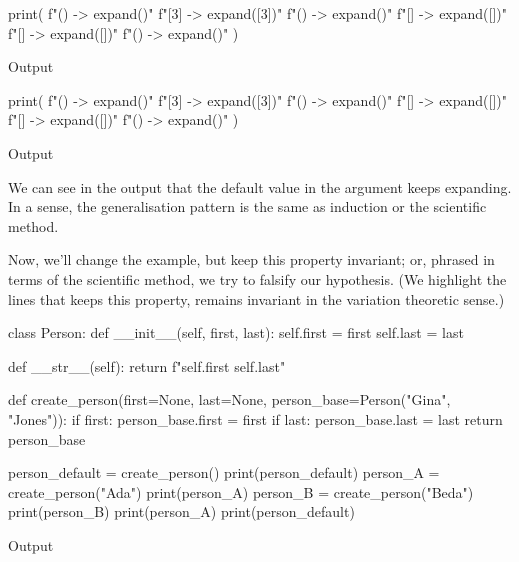 \begin{description}
    \begin{minipage}[t]{0.45\columnwidth}
      \begin{pyblock}[default1]
print(
  f"()  -> {expand()}\n"
  f"[3] -> {expand([3])}\n"
  f"()  -> {expand()}\n"
  f"[]  -> {expand([])}\n"
  f"[]  -> {expand([])}\n"
  f"()  -> {expand()}\n"
)
      \end{pyblock}
      \begin{block}{Output}\printpythontex[verbatim]\end{block}
    \end{minipage}
    \hfill
    \begin{minipage}[t]{0.45\columnwidth}
      \begin{pyblock}[default2]
print(
  f"()  -> {expand()}\n"
  f"[3] -> {expand([3])}\n"
  f"()  -> {expand()}\n"
  f"[]  -> {expand([])}\n"
  f"[]  -> {expand([])}\n"
  f"()  -> {expand()}\n"
)
      \end{pyblock}
      \begin{block}{Output}\printpythontex[verbatim][highlightlines={1,3,6}]\end{block}
    \end{minipage}

    We can see in the output that the default value in the argument keeps 
    expanding.
    In a sense, the generalisation pattern is the same as induction or the 
    scientific method.

    Now, we'll change the example, but keep this property invariant;
    or, phrased in terms of the scientific method, we try to falsify our 
    hypothesis.
    (We highlight the lines that keeps this property, \ie remains invariant in 
    the variation theoretic sense.)
    \begin{pyblock}[default1][highlightlines={10-12}]
class Person:
  def __init__(self, first, last):
    self.first = first
    self.last = last

  def __str__(self):
    return f"{self.first} {self.last}"

def create_person(first=None, last=None,
                  person_base=Person("Gina", "Jones")):
  if first: person_base.first = first
  if last: person_base.last = last
  return person_base

person_default = create_person()
print(person_default)
person_A = create_person("Ada")
print(person_A)
person_B = create_person("Beda")
print(person_B)
print(person_A)
print(person_default)
    \end{pyblock}
    \begin{block}{Output}\printpythontex[verbatim][highlightlines={4-5}]\end{block}


\end{description}
